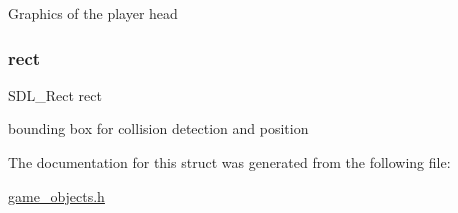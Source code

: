 Graphics of the player head \mbox{\label{structbody__object_a55aefd071649ac9dd8133e2d8a52d11f}} 
\subsubsection{\texorpdfstring{rect}{rect}}
{\footnotesize\ttfamily S\+D\+L\+\_\+\+Rect rect}

bounding box for collision detection and position 

The documentation for this struct was generated from the following file\+:\begin{DoxyCompactItemize}
\item 
\mbox{\hyperlink{game__objects_8h}{game\+\_\+objects.\+h}}\end{DoxyCompactItemize}
